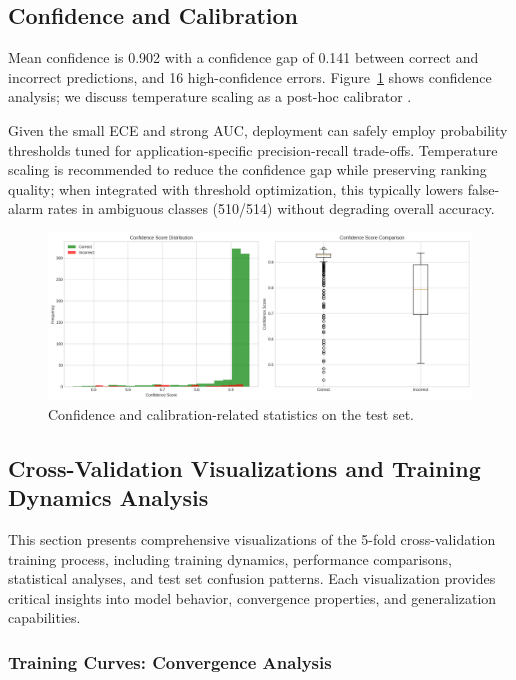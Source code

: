 \documentclass[11pt,a4paper]{article}
\begin{document}
\subsection{Confidence and Calibration}
Mean confidence is 0.902 with a confidence gap of 0.141 between correct and incorrect predictions, and 16 high-confidence errors. Figure~\ref{fig:calibration} shows confidence analysis; we discuss temperature scaling as a post-hoc calibrator \cite{guo2017calibration}.

Given the small ECE and strong AUC, deployment can safely employ probability thresholds tuned for application-specific precision-recall trade-offs. Temperature scaling is recommended to reduce the confidence gap while preserving ranking quality; when integrated with threshold optimization, this typically lowers false-alarm rates in ambiguous classes (510/514) without degrading overall accuracy.

\begin{figure}[H]
  \centering
  \includegraphics[width=.85\linewidth]{images/confidence_analysis.png}
  \caption{Confidence and calibration-related statistics on the test set.}
  \label{fig:calibration}
\end{figure}

\subsection{Cross-Validation Visualizations and Training Dynamics Analysis}

This section presents comprehensive visualizations of the 5-fold cross-validation training process, including training dynamics, performance comparisons, statistical analyses, and test set confusion patterns. Each visualization provides critical insights into model behavior, convergence properties, and generalization capabilities.

\subsubsection{Training Curves: Convergence Analysis}
\end{document}
